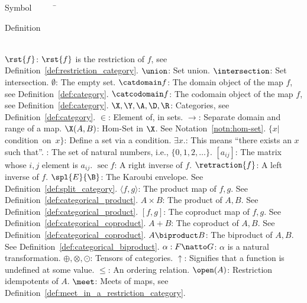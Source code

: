 


\begin{tabbing}
Symbol~~~~~\= \ \ \ \ \ \ \ \ \ \ \ \ \ \ \ \ \ \ \ \ \ \ \ \ \ \ \ \ \ \ \ \ \ \ \ \  \parbox{5in}{Definition}\\

\addsymbol \mbox{$\rst{f}$}: {$\rst{f}$ is the restriction of $f$, see Definition~\ref{def:restriction_category}.}
\addsymbol \mbox{$\union$}: {Set union.}
\addsymbol \mbox{$\intersection$}: {Set intersection.}
\addsymbol \mbox{$\emptyset$}: {The empty set.}
\addsymbol \mbox{$\catdomain f$}: {The domain object of the map $f$, see Definition~\ref{def:category}.}
\addsymbol \mbox{$\catcodomain f$}: {The codomain object of the map $f$, see Definition~\ref{def:category}.}
\addsymbol \mbox{$\X,\Y, \A,\D,\R$}: {Categories, see Definition~\ref{def:category}.}
\addsymbol \mbox{$\in$}: {Element of, in sets.}
\addsymbol \mbox{$\to$}: {Separate domain and range of a map.}
\addsymbol \mbox{$\X(A,B)$}: {Hom-Set in $\X$. See Notation~\ref{notn:hom-set}.}
\addsymbol \mbox{$\{x | $condition on $x\}$}: {Define a set via a condition.}
\addsymbol \mbox{$\exists x.$}: {This means ``there exists an $x$ such that''.}
\addsymbol \mbox{\nat}: {The set of natural numbers, i.e., $\{0,1,2,\ldots\}$.}
\addsymbol \mbox{$[a_{ij}]$}: {The matrix whose $i,j$ element is $a_{ij}$.}
\addsymbol \mbox{$\sec{f}$}: {A right inverse of $f$.}
\addsymbol \mbox{$\retraction{f}$}: {A left inverse of $f$.}
\addsymbol \mbox{$\spl{E}{\B}$}: {The Karoubi envelope. See  Definition~\ref{def:split_category}.}
\addsymbol \mbox{$\langle f,g\rangle$}: {The product map of $f,g$. See Definition~\ref{def:categorical_product}.}
\addsymbol \mbox{$A\times B$}: {The product of $A,B$. See Definition~\ref{def:categorical_product}.}
\addsymbol \mbox{$[f,g]$}: {The coproduct map of $f,g$. See Definition~\ref{def:categorical_coproduct}.}
\addsymbol \mbox{$A+B$}: {The coproduct of $A,B$. See Definition~\ref{def:categorical_coproduct}.}
\addsymbol \mbox{$A\biproduct B$}: {The biproduct of $A,B$. See Definition~\ref{def:categorical_biproduct}.}
\addsymbol \mbox{$\alpha: F\natto G$}: {$\alpha$ is a natural transformation.}
\addsymbol \mbox{$\oplus,\otimes,\odot$}: {Tensors of categories.}
\addsymbol \mbox{$\uparrow$}: {Signifies that a function is undefined at some value.}
\addsymbol \mbox{$\le$}: {An ordering relation.}
\addsymbol \mbox{$\open(A)$}: {Restriction idempotents of $A$.}
\addsymbol \mbox{$\meet$}: {Meets of maps, see Definition~\ref{def:meet_in_a_restriction_category}.}

\end{tabbing}
